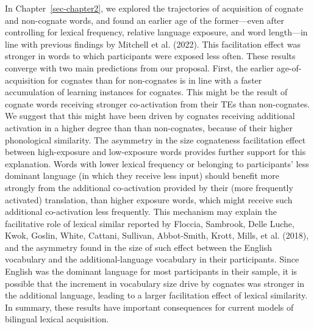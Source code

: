 \documentclass[
  12pt,
  b5paperpaper,
  twoside]{scrreprt}
\begin{document}
In Chapter~\ref{sec-chapter2}, we explored the trajectories of
acquisition of cognate and non-cognate words, and found an earlier age
of the former---even after controlling for lexical frequency, relative
language exposure, and word length---in line with previous findings by
Mitchell et al. (2022). This facilitation effect was stronger in words
to which participants were exposed less often. These results converge
with two main predictions from our proposal. First, the earlier
age-of-acquisition for cognates than for non-cognates is in line with a
faster accumulation of learning instances for cognates. This might be
the result of cognate words receiving stronger co-activation from their
TEs than non-cognates. We suggest that this might have been driven by
cognates receiving additional activation in a higher degree than than
non-cognates, because of their higher phonological similarity. The
asymmetry in the size cognateness facilitation effect between
high-exposure and low-exposure words provides further support for this
explanation. Words with lower lexical frequency or belonging to
participants' less dominant language (in which they receive less input)
should benefit more strongly from the additional co-activation provided
by their (more frequently activated) translation, than higher exposure
words, which might receive such additional co-activation less
frequently. This mechanism may explain the facilitative role of lexical
similar reported by Floccia, Sambrook, Delle Luche, Kwok, Goslin, White,
Cattani, Sullivan, Abbot-Smith, Krott, Mills, et al. (2018), and the
asymmetry found in the size of such effect between the English
vocabulary and the additional-language vocabulary in their participants.
Since English was the dominant language for most participants in their
sample, it is possible that the increment in vocabulary size drive by
cognates was stronger in the additional language, leading to a larger
facilitation effect of lexical similarity. In summary, these results
have important consequences for current models of bilingual lexical
acquisition.
\end{document}
